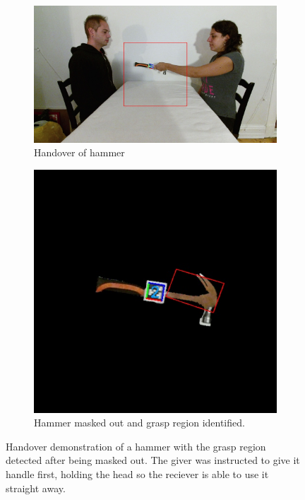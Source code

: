 \begin{figure}
	\centering
	\begin{subfigure}[b]{\textwidth}
		\centering
		\includegraphics[width=\textwidth]{img/methods/handovers/hammer_frame.jpg}
		\caption{Handover of hammer}
		\label{fig:demo_handover_hammer}
	\end{subfigure}
	\par\bigskip
	\begin{subfigure}[b]{0.5\textwidth}
		\centering
		\includegraphics[width=\textwidth]{img/methods/handovers/hammer_masked.jpg}
		\caption{Hammer masked out and grasp region identified.}
		\label{fig:handover_hammer_masked}
	\end{subfigure}
	\caption{Handover demonstration of a hammer with the grasp region detected after being masked out. The giver was instructed to give it handle first, holding the head so the reciever is able to use it straight away.}
	\label{fig:handover_hammer}
\end{figure}

